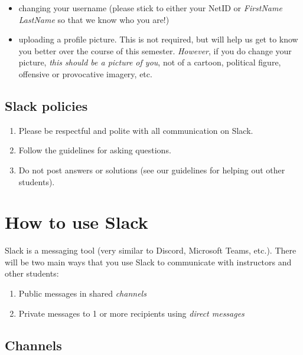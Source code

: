 \documentclass[
]{book}
\providecommand{\tightlist}{%
  \setlength{\itemsep}{0pt}\setlength{\parskip}{0pt}}
\begin{document}
\begin{itemize}
\tightlist
\item
  changing your username (please stick to either your NetID or \emph{FirstName LastName} so that we know who you are!)
\item
  uploading a profile picture. This is not required, but will help us get to know you better over the course of this semester. \emph{However}, if you do change your picture, \emph{this should be a picture of you}, not of a cartoon, political figure, offensive or provocative imagery, etc.
\end{itemize}

\hypertarget{slack-policies}{%
\subsection{Slack policies}\label{slack-policies}}

\begin{enumerate}
\def\labelenumi{\arabic{enumi}.}
\tightlist
\item
  Please be respectful and polite with all communication on Slack.
\item
  Follow the guidelines for asking questions.
\item
  Do not post answers or solutions (see our guidelines for helping out other students).
\end{enumerate}

\hypertarget{how-to-use-slack}{%
\section{How to use Slack}\label{how-to-use-slack}}

Slack is a messaging tool (very similar to Discord, Microsoft Teams, etc.). There will be two main ways that you use Slack to communicate with instructors and other students:

\begin{enumerate}
\def\labelenumi{\arabic{enumi}.}
\tightlist
\item
  Public messages in shared \emph{channels}
\item
  Private messages to 1 or more recipients using \emph{direct messages}
\end{enumerate}

\hypertarget{channels}{%
\subsection{Channels}\label{channels}}
\end{document}
